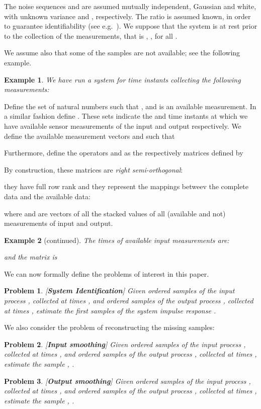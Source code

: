 \documentclass[10pt]{article}
\newtheorem{example}{Example}
\newtheorem{problem}{Problem}
\begin{document}
The noise sequences  and  are assumed mutually
independent, Gaussian and white, with unknown variance  and
, respectively. The ratio  is assumed
known, in order to guarantee identifiability (see
e.g.~\cite{fernando1985identification}). We suppose that the system is at rest
prior to the collection of the measurements, that is , , for all
.

We assume also that some of the samples are not available; see the following
example.

\begin{example}
  We have run a system for  time instants collecting the following measurements:

\end{example}

Define the set of natural numbers  such that
, and  is an
available measurement. In a similar fashion define .
These sets indicate the  and  time instants at
which we have available sensor measurements of the input and output
respectively. We
define the available measurement vectors  and
 such that

Furthermore, define the operators  and  as the  respectively  matrices defined by

By construction, these matrices are \emph{right semi-orthogonal}:

they have full row rank and they represent the mappings betweev the complete
data and the available data:

where  and  are vectors of all the stacked values of all (available and
  not) measurements of input and output.
\setcounter{example}{0}
\begin{example}[continued]
  The times of available input measurements are:
  
  and the  matrix  is
  
\end{example}
\vspace{0.5em}

We can now formally define the problems of interest in this paper.
\begin{problem}\label{problem:1}[\textbf{System Identification}]
Given  ordered samples of the input process , collected at times
, and  ordered samples of the output process , collected at
times , estimate the first  samples of the system impulse response
.
\end{problem}
We also consider the problem of reconstructing the missing samples:
\begin{problem}\label{problem:2}[\textbf{Input smoothing}]
Given  ordered samples of the input process , collected at times
, and  ordered samples of the output process , collected at
times , estimate the sample , .
\end{problem}
\begin{problem}\label{problem:3}[\textbf{Output smoothing}]
Given  ordered samples of the input process , collected at times
, and  ordered samples of the output process , collected at
times , estimate the sample , .
\end{problem}
\end{document}
